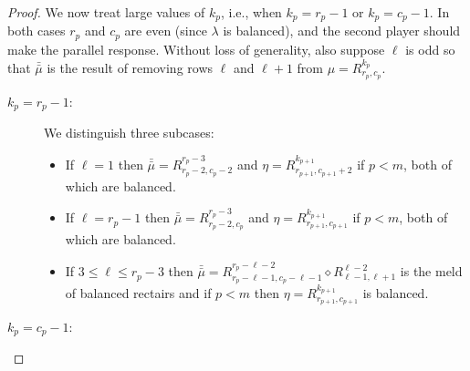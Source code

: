 \documentclass[pdflatex,sn-mathphys-num]{sn-jnl}%
\theoremstyle{thmstyleone}%
\theoremstyle{thmstyletwo}%
\theoremstyle{thmstylethree}%
\begin{document}
\begin{proof}
We now treat large values of $k_p$, i.e., when $k_p = r_p-1$ or $k_p = c_p - 1$. 
In both cases $r_p$ and $c_p$ are even (since $\lambda$ is balanced), and the second player should make the parallel response. 
            Without loss of generality, also suppose $\ell$ is odd so that $\bar{\bar \mu}$ is the result of removing rows $\ell$ and $\ell + 1$ from $\mu = R^{k_{p}}_{r_{p}, c_{p}}$.

        \begin{description}
            \item[$k_p = r_p-1$:] We distinguish  three subcases: 
            \begin{itemize}
                \item If $\ell = 1$ then $\bar{\bar \mu} = R^{r_p-3}_{r_p-2, c_p-2}$ and $\eta = R^{k_{p+1}}_{r_{p+1}, c_{p+1}+2}$ if $p < m$, both of which are balanced. 
                \item If $\ell = r_p-1$ then $\bar{\bar \mu} = R^{r_p-3}_{r_p-2, c_p}$ and $\eta = R^{k_{p+1}}_{r_{p+1}, c_{p+1}}$ if $p < m$, both of which are balanced. 
                \item If $3 \leq \ell \leq r_p-3$ then $\bar{\bar \mu} =  R^{r_p - \ell - 2}_{r_p - \ell - 1, c_p - \ell -1} \diamond R^{\ell-2}_{\ell-1, \ell + 1} $ is the meld of balanced rectairs and if $p < m$ then $\eta = R^{k_{p+1}}_{r_{p+1}, c_{p+1}}$ is balanced. 
            \end{itemize}
            \item[$k_p = c_p-1$:] 

\end{description}
\end{proof}
\end{document}
